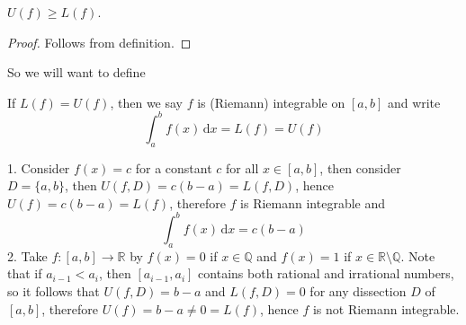 \begin{lemma}
    $U(f)\ge L(f)$.
\end{lemma}
\begin{proof}
    Follows from definition.
\end{proof}
So we will want to define
\begin{definition}
    If $L(f)=U(f)$, then we say $f$ is (Riemann) integrable on $[a,b]$ and write
    $$\int_a^bf(x)\,\mathrm dx=L(f)=U(f)$$
\end{definition}
\begin{example}
    1. Consider $f(x)=c$ for a constant $c$ for all $x\in [a,b]$, then consider $D=\{a,b\}$, then $U(f,D)=c(b-a)=L(f,D)$, hence $U(f)=c(b-a)=L(f)$, therefore $f$ is Riemann integrable and
    $$\int_a^bf(x)\,\mathrm dx=c(b-a)$$
    2. Take $f:[a,b]\to\mathbb R$ by $f(x)=0$ if $x\in\mathbb Q$ and $f(x)=1$ if $x\in\mathbb R\setminus\mathbb Q$.
    Note that if $a_{i-1}<a_i$, then $[a_{i-1},a_i]$ contains both rational and irrational numbers, so it follows that $U(f,D)=b-a$ and $L(f,D)=0$ for any dissection $D$ of $[a,b]$, therefore $U(f)=b-a\neq 0=L(f)$, hence $f$ is not Riemann integrable.
\end{example}
